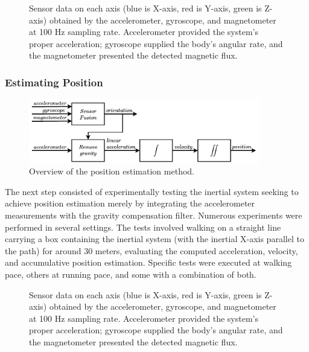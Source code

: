 \begin{figure}
    \centering
    \resizebox{1\linewidth}{!}{}
    \caption{Sensor data on each axis (blue is X-axis, red is Y-axis, green is Z-axis) obtained by the accelerometer, gyroscope, and magnetometer at 100 Hz sampling rate. Accelerometer provided the system's proper acceleration; gyroscope supplied the body's angular rate, and the magnetometer presented the detected magnetic flux.}
\end{figure}

\subsubsection{Estimating Position}

\begin{figure}[!h]
    \centering
    \includegraphics[width=0.9\textwidth]{figures/orientation_position.pdf}
    \caption{Overview of the position estimation method.}
    \label{fig:position}
\end{figure}

The next step consisted of experimentally testing the inertial system seeking to achieve position estimation merely by integrating the accelerometer measurements with the gravity compensation filter. Numerous experiments were performed in several settings. The tests involved walking on a straight line carrying a box containing the inertial system (with the inertial X-axis parallel to the path) for around 30 meters, evaluating the computed acceleration, velocity, and accumulative position estimation. Specific tests were executed at walking pace, others at running pace, and some with a combination of both.

\begin{figure}[!h]
    \centering
    \resizebox{1\linewidth}{!}{}
    \caption{Sensor data on each axis (blue is X-axis, red is Y-axis, green is Z-axis) obtained by the accelerometer, gyroscope, and magnetometer at 100 Hz sampling rate. Accelerometer provided the system's proper acceleration; gyroscope supplied the body's angular rate, and the magnetometer presented the detected magnetic flux.}
    \label{fig:sensoroutput}
\end{figure}

